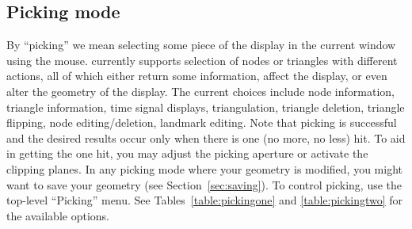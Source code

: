 \subsection{Picking mode}
\label{sec:control-picking} 

By ``picking'' we mean selecting some piece of the display in the current
window using the mouse.  \map{} currently supports selection of nodes or
triangles with different actions, all of which either return some
information, affect the display, or even alter the geometry of the display.
The current choices include node information, triangle information, time
signal displays, triangulation, triangle deletion, triangle flipping, node
editing/deletion, landmark editing.  Note that picking is successful and
the desired results occur only when there is one (no more, no less) hit.
To aid in getting the one hit, you may adjust the picking aperture or
activate the clipping planes.  In any picking mode where your geometry is
modified, you might want to save your geometry (see
Section~\ref{sec:saving}).  To control picking, use the top-level
``Picking'' menu. See Tables~\ref{table:pickingone} and
\ref{table:pickingtwo} for the available options.




